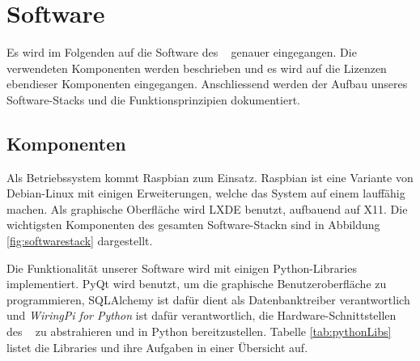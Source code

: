 \section{Software \Master}
\label{sec:software:master}

Es wird  im Folgenden auf  die Software des \Master~  genauer eingegangen. Die
verwendeten  Komponenten  werden beschrieben  und  es  wird auf  die  Lizenzen
ebendieser  Komponenten eingegangen. Anschliessend  werden der  Aufbau unseres
Software-Stacks und die Funktionsprinzipien dokumentiert.


\subsection{Komponenten}
\label{subsec:software:master:components}

Als Betriebssystem kommt Raspbian zum  Einsatz. Raspbian ist eine Variante von
Debian-Linux mit  einigen Erweiterungen,  welche das  System auf  einem \Raspi
lauff\"ahig machen. Als  graphische Oberfl\"ache wird LXDE  benutzt, aufbauend
auf  X11. Die wichtigsten  Komponenten  des gesamten  Software-Stackn sind  in
Abbildung \ref{fig:softwarestack} dargestellt.

Die  Funktionalit\"at  unserer  Software  wird  mit  einigen  Python-Libraries
implementiert. PyQt  wird  benutzt,  um  die  graphische  Benutzeroberfl\"ache
zu   programmieren,  SQLAlchemy   ist  daf\"ur   dient  als   Datenbanktreiber
verantwortlich  und \emph{WiringPi  for  Python}  ist daf\"ur  verantwortlich,
die  Hardware-Schnittstellen  des  \Raspi~   zu  abstrahieren  und  in  Python
bereitzustellen. Tabelle  \ref{tab:pythonLibs} listet  die Libraries  und ihre
Aufgaben in einer \"Ubersicht auf.

